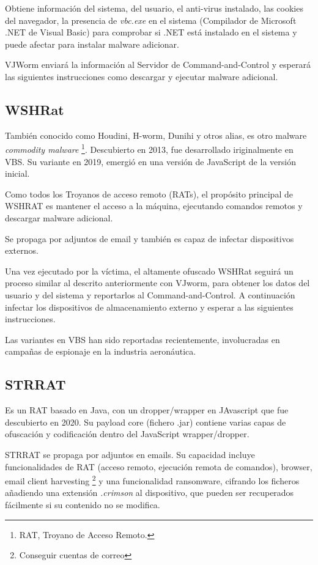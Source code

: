 \documentclass[15pt]{article}
\begin{document}
	Obtiene información del sistema, del usuario, el anti-virus instalado, las cookies del navegador, la presencia de \textit{vbc.exe} en el sistema (Compilador de Microsoft .NET de Visual Basic) para comprobar si .NET está instalado en el sistema y puede afectar para instalar malware adicionar.
	
	VJWorm enviará la información al Servidor de Command-and-Control y esperará las siguientes instrucciones como descargar y ejecutar malware adicional.
	
	\subsection{WSHRat}
	
	También conocido como Houdini, H-worm, Dunihi y otros alias, es otro malware \textit{commodity malware} \footnote{RAT, Troyano de Acceso Remoto.}. Descubierto en 2013, fue desarrollado iriginalmente en VBS. Su variante en 2019, emergió en una versión de JavaScript de la versión inicial.
	
	Como todos los Troyanos de acceso remoto (RATs), el propósito principal de WSHRAT es mantener el acceso a la máquina, ejecutando comandos remotos y descargar malware adicional.
	
	Se propaga por adjuntos de email y también es capaz de infectar dispositivos externos.
	
	Una vez ejecutado por la víctima, el altamente ofuscado WSHRat seguirá un proceso similar al descrito anteriormente con VJworm, para obtener los datos del usuario y del sistema y reportarlos al Command-and-Control. A continuación infectar los dispositivos de almacenamiento externo y esperar a las siguientes instrucciones.
	
	Las variantes en VBS han sido reportadas recientemente, involucradas en campañas de espionaje en la industria aeronáutica.
	
	\subsection{STRRAT}
	Es un RAT basado en Java, con un dropper/wrapper en JAvascript que fue descubierto en 2020. Su payload core (fichero .jar) contiene varias capas de ofuscación y codificación dentro del JavaScript wrapper/dropper.
	
	STRRAT se propaga por adjuntos en emails. Su capacidad incluye funcionalidades de RAT (acceso remoto, ejecución remota de comandos), browser, email client harvesting \footnote{Conseguir cuentas de correo} y una funcionalidad ransomware, cifrando los ficheros añadiendo una extensión \textit{.crimson} al dispositivo, que pueden ser recuperados fácilmente si su contenido no se modifica.
	
\end{document}
